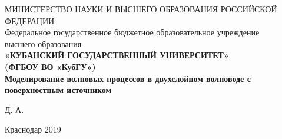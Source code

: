 \documentclass[a4paper]{article}
\begin{document}
\begin{center}
  \hfill \break
  \footnotesize{МИНИСТЕРСТВО НАУКИ И ВЫСШЕГО ОБРАЗОВАНИЯ РОССИЙСКОЙ ФЕДЕРАЦИИ}\\
  \footnotesize{Федеральное государственное бюджетное образовательное учреждение}\\ 
  \footnotesize{высшего образования}\\
  \small{\textbf{«КУБАНСКИЙ ГОСУДАРСТВЕННЫЙ УНИВЕРСИТЕТ»}}\\
  \small{\textbf{(ФГБОУ ВО «КубГУ»)}}\\
  \hfill \break
  \hfill \break
  \hfill \break
  \Large{\bf Моделирование волновых процессов в двухслойном волноводе с поверхностным источником}\\
  \hfill \break
  \hfill \break
  \hfill \break
  \begin{flushright}
  \large{ Д. А.}
  \end{flushright}
  \hfill \break
  \hfill \break
  \end{center}
  \hfill \break
  \hfill \break
  \begin{center} Краснодар 2019 \end{center}
  \thispagestyle{empty} %
  
\newpage

\tableofcontents
\newpage
\thispagestyle{empty}
\end{document}
